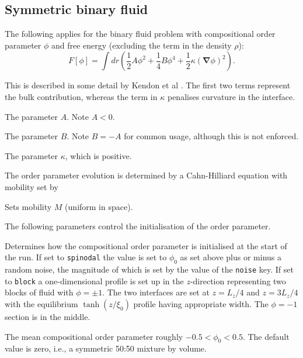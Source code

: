 \subsection{Symmetric binary fluid}


The following applies for the binary fluid problem with
compositional order parameter $\phi$ and free energy
(excluding the term in the density $\rho$):
\begin{equation}
 F[\phi] = 
\int dr \left(
{\textstyle \frac{1}{2}}A\phi^2
+ {\textstyle \frac{1}{4}}B\phi^4
+ {\textstyle \frac{1}{2}}\kappa (\mathbf{\nabla}\phi)^2 \right).
\end{equation}

This is described in some detail
by Kendon et al \cite{viv}. The first two terms represent the bulk
contribution, whereas the term in $\kappa$ penalises curvature in
the interface.

 The parameter $A$. Note $A < 0$.

 The parameter $B$. Note $B = -A$ for common usage,
although this is not enforced.

 The parameter $\kappa$, which is positive.

The order parameter evolution is determined by a Cahn-Hilliard equation
with mobility set by

 Sets mobility $M$ (uniform in space).

The following parameters control the initialisation of the order
parameter.


Determines how the compositional order parameter is initialised
at the start of the run. If set to \texttt{spinodal} the value
is set to $\phi_0$ as set above plus or minus a random noise, the
magnitude of which is set by the value of the \texttt{noise} key.
If set to \texttt{block} a one-dimensional profile is set up in
the $z$-direction representing two blocks of fluid with
$\phi = \pm 1$. The two interfaces are set at $z = L_z/4$ and
$z = 3L_z/4$ with the equilibrium $\tanh(z/\xi_0)$ profile having 
appropriate width. The $\phi = -1$ section is in the middle.


The mean compositional order parameter roughly $-0.5 < \phi_0 < 0.5$.
The default value is zero, i.e., a symmetric 50:50 mixture by volume.


